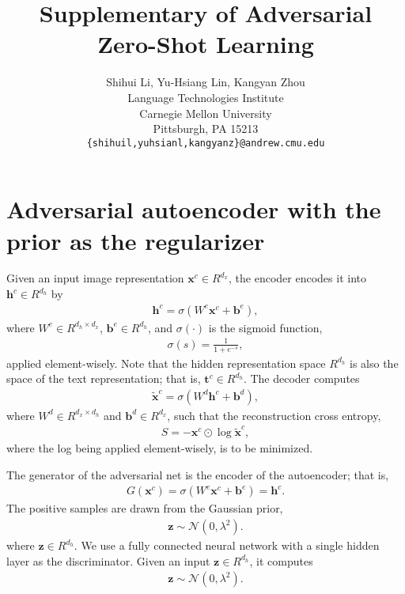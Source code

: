 \documentclass{article}
\title{Supplementary of Adversarial Zero-Shot Learning}
\author{
	Shihui Li, Yu-Hsiang Lin, Kangyan Zhou
		\\
	Language Technologies Institute\\
	Carnegie Mellon University\\
	Pittsburgh, PA 15213 \\
	\texttt{\{shihuil,yuhsianl,kangyanz\}@andrew.cmu.edu} \\
}
\newcommand{\bb}[1]{\boldsymbol{#1}}
\begin{document}

\maketitle







\section{Adversarial autoencoder with the prior as the regularizer}

	Given an input image representation $\bb{x}^c \in R^{d_x}$, the encoder encodes it into $\bb{h}^c \in R^{d_h}$ by
	\begin{align}
		\bb{h}^c = \sigma(W^e \bb{x}^c + \bb{b}^e),
	\end{align}
	where $W^e \in R^{d_h \times d_x}$, $\bb{b}^e \in R^{d_h}$, and $\sigma(\cdot)$ is the sigmoid function,
	\begin{align}
		\sigma(s) = \frac{1}{1 + e^{-s}},
	\end{align}
	applied element-wisely. Note that the hidden representation space $R^{d_h}$ is also the space of the text representation; that is, $\bb{t}^c \in R^{d_h}$. The decoder computes
	\begin{align}
		\tilde{\bb{x}}^c = \sigma(W^d \bb{h}^c + \bb{b}^d),
	\end{align}
	where $W^d \in R^{d_x \times d_h}$ and $\bb{b}^d \in R^{d_x}$, such that the reconstruction cross entropy,
	\begin{align}
		S = -\bb{x}^c \odot \log \tilde{\bb{x}}^c,
	\end{align}
	where the log being applied element-wisely, is to be minimized.
	
	The generator of the adversarial net is the encoder of the autoencoder; that is,
	\begin{align}
		G(\bb{x}^c) = \sigma(W^e \bb{x}^c + \bb{b}^e) = \bb{h}^c.
	\end{align}
	The positive samples are drawn from the Gaussian prior,
	\begin{align}
		\bb{z} \sim \mathcal{N}(0, \lambda^2).
	\end{align}
	where $\bb{z} \in R^{d_h}$.	We use a fully connected neural network with a single hidden layer as the discriminator. Given an input $\bb{z} \in R^{d_h}$, it computes
	\begin{align}
		\bb{z} \sim \mathcal{N}(0, \lambda^2).
	\end{align}
\end{document}
